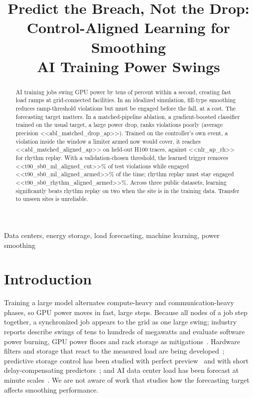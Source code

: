 \documentclass[conference]{IEEEtran}
\begin{document}
\title{Predict the Breach, Not the Drop:\\Control-Aligned Learning for Smoothing\\AI Training Power Swings}

\author{
}

\maketitle

\begin{abstract}
AI training jobs swing GPU power by tens of percent within a second, creating fast load ramps at
grid-connected facilities. In an idealized simulation, fill-type smoothing reduces ramp-threshold
violations but must be engaged before the fall, at a cost. The forecasting target matters. In a
matched-pipeline ablation, a gradient-boosted classifier trained on the usual target, a large power drop,
ranks violations poorly (average precision <<abl_matched_drop_ap>>). Trained on the controller's own event,
a violation inside the window a limiter armed now would cover, it reaches <<abl_matched_aligned_ap>> on
held-out H100 traces, against <<nlr_ap_rh>> for rhythm replay. With a validation-chosen threshold, the
learned trigger removes <<t90_sb0_ml_aligned_cut>>\% of test violations while engaged
<<t90_sb0_ml_aligned_armed>>\% of the time; rhythm replay must stay engaged <<t90_sb0_rhythm_aligned_armed>>\%.
Across three public datasets, learning significantly beats rhythm replay on two when the site is in the
training data. Transfer to unseen sites is unreliable.
\end{abstract}

\begin{IEEEkeywords}
Data centers, energy storage, load forecasting, machine learning, power smoothing
\end{IEEEkeywords}

\section{Introduction}
Training a large model alternates compute-heavy and communication-heavy phases, so GPU power moves in
fast, large steps. Because all nodes of a job step together, a synchronized job appears to the grid as
one large swing; industry reports describe swings of tens to hundreds of megawatts and evaluate software
power burning, GPU power floors and rack storage as mitigations~\cite{msft_stab}. Hardware filters and
storage that react to the measured load are being developed~\cite{easyrider,activefilter}; predictive
storage control has been studied with perfect preview~\cite{hessdpc} and with short delay-compensating
predictors~\cite{lyu}; and AI data center load has been forecast at minute scales~\cite{mughees}. We are
not aware of work that studies how the forecasting target affects smoothing performance.
\end{document}
